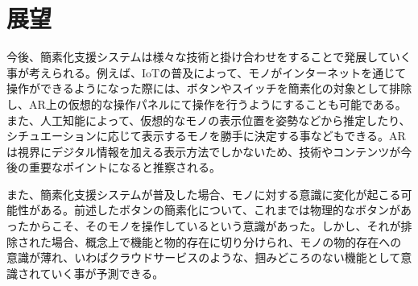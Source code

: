 
\chapter{展望}
\label{chap:outlook}

今後、簡素化支援システムは様々な技術と掛け合わせをすることで発展していく事が考えられる。例えば、IoTの普及によって、モノがインターネットを通じて操作ができるようになった際には、ボタンやスイッチを簡素化の対象として排除し、AR上の仮想的な操作パネルにて操作を行うようにすることも可能である。また、人工知能によって、仮想的なモノの表示位置を姿勢などから推定したり、シチュエーションに応じて表示するモノを勝手に決定する事などもできる。ARは視界にデジタル情報を加える表示方法でしかないため、技術やコンテンツが今後の重要なポイントになると推察される。

また、簡素化支援システムが普及した場合、モノに対する意識に変化が起こる可能性がある。前述したボタンの簡素化について、これまでは物理的なボタンがあったからこそ、そのモノを操作しているという意識があった。しかし、それが排除された場合、概念上で機能と物的存在に切り分けられ、モノの物的存在への意識が薄れ、いわばクラウドサービスのような、掴みどころのない機能として意識されていく事が予測できる。